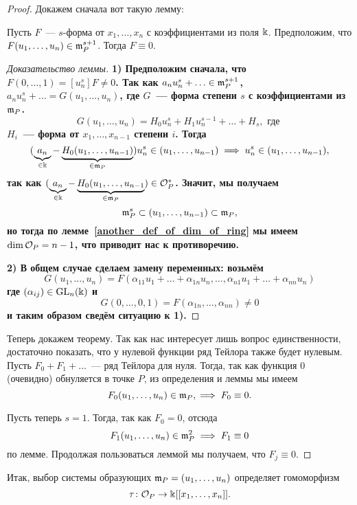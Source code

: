 	\begin{proof}
		Докажем сначала вот такую лемму: 
		\begin{lemma}\label{taylor_series_lemma} 
			Пусть $F$~--- $s$-форма от $x_1, \ldots, x_n$ с коэффициентами из поля $\Bbbk$. Предположим, что $F(u_1, \ldots, u_n) \in \mathfrak{m}_P^{s + 1}$. Тогда $F \equiv 0$.
		\end{lemma}
		\begin{proof}[Доказательство леммы]
			\bf{1)} Предположим сначала, что $F(0, \ldots, 1) = [u_n^s]F \neq 0$. Так как $a_n u_n^s + \ldots \in \mathfrak{m}_P^{s + 1}$, $a_n u_n^s + \ldots = G(u_1, \ldots, u_n)$, где $G$~--- форма степени  $s$ с коэффициентами из $\mathfrak{m}_P$. 
			\[
				G(u_1, \ldots, u_n) = H_0 u_n^s + H_1 u_n^{s - 1} + \ldots + H_s, \text{ где }
			\]
			$H_i$~--- форма от $x_1, \ldots, x_{n - 1}$ степени $i$. Тогда 
			\[
				(\underbrace{a_n}_{\in \Bbbk} - \underbrace{H_0(u_1, \ldots, u_{n - 1})}_{\in \mathfrak{m}_{P}})u_{n}^s \in (u_1, \ldots, u_{n - 1}) \implies u_n^s \in (u_1, \ldots, u_{n - 1}),
			\]
			так как $(\underbrace{a_n}_{\in \Bbbk} - \underbrace{H_0(u_1, \ldots, u_{n - 1}}_{\in \mathfrak{m}_P}) \in \mathcal{O}_P^*$. Значит, мы получаем 
			\[
				\mathfrak{m}_P^s \subset (u_1, \ldots, u_{n - 1}) \subset \mathfrak{m}_P,
			\]
			но тогда по лемме~\ref{another_def_of_dim_of_ring} мы имеем $\dim{\mathcal{O}_P} = n - 1$, что приводит нас к противоречию. 

			\noindent\bf{2)} В общем случае сделаем замену переменных: возьмём
			\[
				G(u_1, \ldots, u_n) = F(\alpha_11 u_1 + \ldots + \alpha_{1n}u_n, \ldots, \alpha_{n 1}u_1 + \ldots + \alpha_{n n} u_n)
			\]
			где $(\alpha_{i j}) \in \mathrm{GL}_n(\Bbbk)$ и 
			\[
				G(0, \ldots, 0, 1) = F(\alpha_{1 n}, \ldots, \alpha_{n n}) \neq 0
			\]
			и таким образом сведём ситуацию к \bf{1)}.
		\end{proof}

		Теперь докажем теорему. Так как нас интересует лишь вопрос единственности, достаточно показать, что у нулевой функции ряд Тейлора также будет нулевым. Пусть $F_0 + F_1 + \ldots $~--- ряд Тейлора для нуля. Тогда, так как функция 0 (очевидно) обнуляется в точке $P$, из определения и леммы мы имеем 
		\[
			F_0(u_1, \ldots, u_n)\in \mathfrak{m}_{P}, \implies F_0 \equiv 0.
		\]

		Пусть теперь $s = 1$. Тогда, так как $F_0 = 0$, отсюда 
		\[
			F_1(u_1, \ldots, u_n) \in \mathfrak{m}_P^2 \implies F_1 \equiv 0
		\]
		по лемме. Продолжая пользоваться леммой мы получаем, что $F_j \equiv 0$. 
	\end{proof}

	Итак, выбор системы образующих $\mathfrak{m}_P = (u_1, \ldots, u_n)$ определяет гомоморфизм 
	\[
		\tau\colon \mathcal{O}_P  \to  \Bbbk[[x_1, \ldots, x_n]].
	\]

